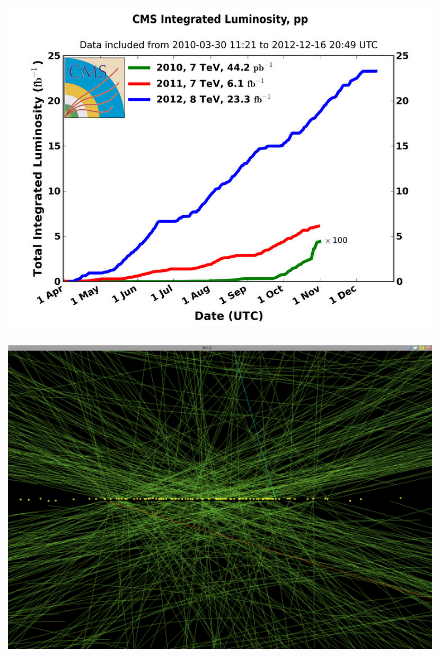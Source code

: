 \begin{frame}{}
\vspace{-.2cm}

\begin{columns}
\begin{column}{.50\textwidth}
\begin{figure}[!Hhtbp]
  \begin{center}
    \includegraphics[width=1.0\textwidth]{../figs/cms-int-10to12.jpg}
  \end{center}
\end{figure}
\vspace{-.5cm}
\begin{figure}[!Hhtbp]
  \begin{center}
    \includegraphics[width=1.0\textwidth]{../figs/pileup.png}
  \end{center}
\end{figure}
\end{column}


\end{columns}
\end{frame}
